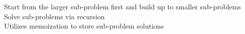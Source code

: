 \documentclass[preview]{standalone}
\begin{document}
Start from the larger sub-problem first and build up to smaller sub-problems\\Solve sub-problems via recursion\\Utilizes memoization to store sub-problem solutions\\
\end{document}
